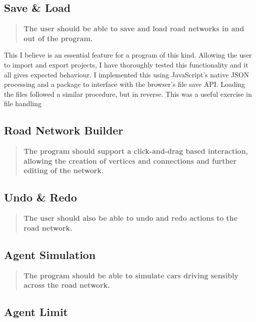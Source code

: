     \subsection{Save \& Load}

        \begin{quote}
            \textbf{The user should be able to save and load road networks in and out of the program.}
        \end{quote}

        This I believe is an essential feature for a program of this kind. Allowing the user to import and export projects, I have thoroughly tested this functionality and it all gives expected behaviour. I implemented this using JavaScript's native JSON processing and a package to interface with the browser's file save API. Loading the files followed a similar procedure, but in reverse. This was a useful exercise in file handling

    \subsection{Road Network Builder}

        \begin{quote}
            \textbf{The program should support a click-and-drag based interaction, allowing the creation of vertices and connections and further editing of the network.}
        \end{quote}

    \subsection{Undo \& Redo}

        \begin{quote}
            \textbf{The user should also be able to undo and redo actions to the road network.}
        \end{quote}

    \subsection{Agent Simulation}

        \begin{quote}
            \textbf{The program should be able to simulate cars driving sensibly across the road network.}
        \end{quote}

    \subsection{Agent Limit}

